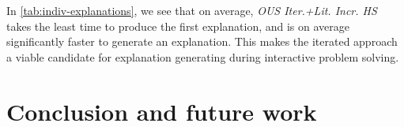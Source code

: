 \documentclass[a4paper,UKenglish,cleveref, autoref, thm-restate, pdfa]{lipics-v2021}
\begin{document}
				
				In \cref{tab:indiv-explanations}, we see that on average, \emph{OUS Iter.+Lit. Incr. HS} takes the least time to produce the first explanation, and is on average significantly faster to generate an explanation. This makes the iterated approach a viable candidate for explanation generating during interactive problem solving.
				
				\section{Conclusion and future work}
				
\end{document}
